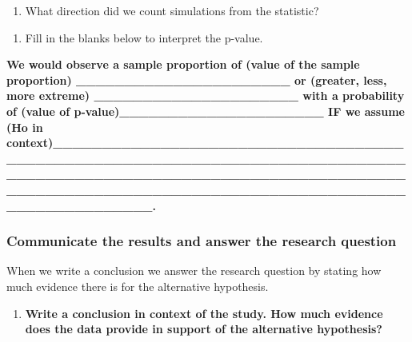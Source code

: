 \documentclass[
]{report}
\providecommand{\tightlist}{%
  \setlength{\itemsep}{0pt}\setlength{\parskip}{0pt}}
\begin{document}
\vspace{0.3in}

\begin{enumerate}
\def\labelenumi{\arabic{enumi}.}
\setcounter{enumi}{11}
\tightlist
\item
  What direction did we count simulations from the statistic?
  \vspace{0.3in}
\end{enumerate}


\begin{enumerate}
\def\labelenumi{\arabic{enumi}.}
\setcounter{enumi}{12}
\tightlist
\item
  Fill in the blanks below to interpret the p-value.
\end{enumerate}

\textbf{We would observe a sample proportion of (value of the sample proportion) \_\_\_\_\_\_\_\_\_\_\_\_\_\_\_\_\_\_\_\_\_\_ or (greater, less, more extreme) \_\_\_\_\_\_\_\_\_\_\_\_\_\_\_\_\_\_\_\_\_ with a probability of (value of p-value)\_\_\_\_\_\_\_\_\_\_\_\_\_\_\_\_\_\_\_\_\_ IF we assume (Ho in context)\_\_\_\_\_\_\_\_\_\_\_\_\_\_\_\_\_\_\_\_\_\_\_\_\_\_\_\_\_\_\_\_\_\_\_\_\_\_\_\_\_\_\_\_\_\_\_\_\_\_\_\_\_\_\_\_\_\_\_\_\_\_\_\_\_\_\_\_\_\_\_\_\_\_\_\_\_\_\_\_\_\_\_\_\_\_\_\_\_\_\_\_\_\_\_\_\_\_\_\_\_\_\_\_\_\_\_\_\_\_\_\_\_\_\_\_\_\_\_\_\_\_\_\_\_\_\_\_\_\_\_\_\_\_\_\_\_\_\_\_\_\_\_\_\_\_\_\_\_\_\_\_\_\_\_\_\_\_\_\_\_\_\_\_\_\_\_\_\_\_\_\_\_\_.}

\hypertarget{communicate-the-results-and-answer-the-research-question}{%
\subsubsection*{Communicate the results and answer the research question}\label{communicate-the-results-and-answer-the-research-question}}

When we write a conclusion we answer the research question by stating how much evidence there is for the alternative hypothesis.

\begin{enumerate}
\def\labelenumi{\arabic{enumi}.}
\setcounter{enumi}{13}
\tightlist
\item
  \textbf{Write a conclusion in context of the study. How much evidence does the data provide in support of the alternative hypothesis?}
\end{enumerate}
\end{document}
